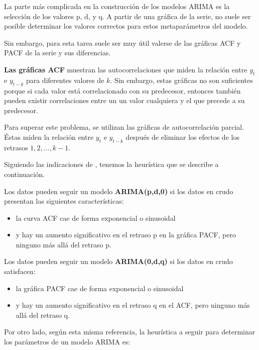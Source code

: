 \documentclass[]{book}
\providecommand{\tightlist}{%
  \setlength{\itemsep}{0pt}\setlength{\parskip}{0pt}}
\begin{document}
La parte más complicada en la construcción de los modelos ARIMA es la
selección de los valores p, d, y q. A partir de una gráfica de la serie,
no suele ser posible determinar los valores correctos para estos
metaparámetros del modelo.

Sin embargo, para esta tarea suele ser muy útil valerse de las gráficas
ACF y PACF de la serie y sus diferencias.

\textbf{Las gráficas ACF} muestran las autocorrelaciones que miden la
relación entre \(y_t\) e \(y_{t-k}\) para diferentes valores de \(k\).
Sin embargo, estas gráficas no son suficientes porque si cada valor está
correlacionado con su predecesor, entonces también pueden existir
correlaciones entre un un valor cualquiera y el que precede a su
predecesor.

Para superar este problema, se utilizan las gráficas de autocorrelación
parcial. Éstas miden la relación entre \(y_t\) e \(y_{t-k}\) después de
eliminar los efectos de los retrasos \(1,2,...,k-1\).

Siguiendo las indicaciones de \citep{Forecast6-online}, tenemos la
heurística que se describe a continuación.

Los datos pueden seguir un modelo \textbf{ARIMA(p,d,0)} si los datos en
crudo presentan las siguientes características:

\begin{itemize}
\tightlist
\item
  la curva ACF cae de forma exponencial o sinusoidal
\item
  y hay un aumento significativo en el retraso p en la gráfica PACF,
  pero ninguno más allá del retraso p.
\end{itemize}

Los datos pueden seguir un modelo \textbf{ARIMA(0,d,q)} si los datos en
crudo satisfacen:

\begin{itemize}
\tightlist
\item
  la gráfica PACF cae de forma exponencial o sinusoidal
\item
  y hay un aumento significativo en el retraso q en el ACF, pero ninguno
  más allá del retraso q.
\end{itemize}

Por otro lado, según esta misma referencia, la heurística a seguir para
determinar los parámetros de un modelo ARIMA es:
\end{document}
